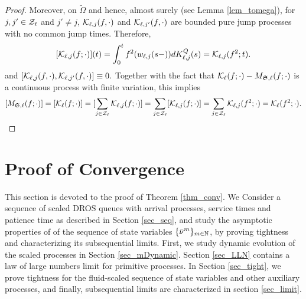 \documentclass{article}
\theoremstyle{definition}
\numberwithin{equation}{section}
\begin{document}
\begin{proof}
Moreover, on $\tilde\Omega$ and hence, almost surely (see Lemma \ref{lem_tomega}), for $j,j'\in\mathcal{Z}_\ell$  and $j'\neq j$, $\mathcal{K}_{\ell,j}(f,\cdot)$ and $\mathcal{K}_{\ell,j'}(f,\cdot)$ are bounded pure jump processes with no common jump times. Therefore,
\[
[\mathcal{K}_{\ell,j}(f;\cdot)](t) = \int_{0}^{t} f^2(w_{\ell,j}(s-))dK^Q_{\ell,j}(s) = \mathcal{K}_{\ell,j}(f^2;t).
\]
and $[ \mathcal{K}_{\ell,j}(f,\cdot),\mathcal{K}_{\ell,j'}(f,\cdot)] \equiv 0.$  Together with the fact that $\mathcal{K}_{\ell}(f;\cdot)-M_{\mathfrak{S},\ell}(f;\cdot)$ is a continuous process with finite variation, this implies
\[ [M_{\mathfrak{S},\ell}(f;\cdot)] = [\mathcal{K}_{\ell}(f;\cdot)] = [\sum_{j\in\mathcal{Z}_\ell}\mathcal{K}_{\ell,j}(f;\cdot)] = \sum_{j\in\mathcal{Z}_\ell}[\mathcal{K}_{\ell,j}(f;\cdot)] =\sum_{j\in\mathcal{Z}_\ell}\mathcal{K}_{\ell,j}(f^2;\cdot)=\mathcal{K}_{\ell}(f^2;\cdot). \]
\end{proof}












\section{Proof of Convergence}\label{sec_convproof}

This section is devoted to the proof of Theorem \ref{thm_conv}. We Consider a sequence of scaled DROS queues  with arrival processes, service times and patience time as described in Section \ref{sec_seq}, and study the asymptotic properties of of the sequence of state variables $\{\bar{\nu}^m\}_{m\in\mathbb{N}}$, by proving tightness and characterizing its subsequential limits. First, we study dynamic evolution of the scaled processes in Section \ref{sec_mDynamic}.  Section \ref{sec_LLN} contains a law of large numbers limit for primitive processes. In Section \ref{sec_tight}, we prove tightness for the fluid-scaled sequence of state variables and other auxiliary processes, and finally, subsequential limits are characterized in section \ref{sec_limit}.
\end{document}
